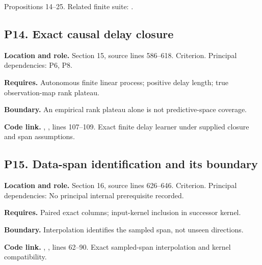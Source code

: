\documentclass[11pt,oneside,openany]{book}
\numberwithin{equation}{section}
\begin{document}
Propositions 14--25. Related finite suite:
.

\par\noindent\begin{minipage}{\textwidth}
\subsection{P14. Exact causal delay
closure}\label{LSMRegister:p14.-exact-causal-delay-closure}

\textbf{Location and role.} Section 15, source lines 586--618.
Criterion. Principal dependencies: P6, P8.

\textbf{Requires.} Autonomous finite linear process; positive delay
length; true observation-map rank plateau.

\textbf{Boundary.} An empirical rank plateau alone is not
predictive-space coverage.

\textbf{Code link.} ,
, lines 107--109. Exact finite delay learner under
supplied closure and span assumptions.
\end{minipage}\par\medskip

\par\noindent\begin{minipage}{\textwidth}
\subsection{P15. Data-span identification and its
boundary}\label{LSMRegister:p15.-data-span-identification-and-its-boundary}

\textbf{Location and role.} Section 16, source lines 626--646.
Criterion. Principal dependencies: No principal internal prerequisite
recorded.

\textbf{Requires.} Paired exact columns; input-kernel inclusion in
successor kernel.

\textbf{Boundary.} Interpolation identifies the sampled span, not unseen
directions.

\textbf{Code link.} ,
, lines 62--90. Exact sampled-span
interpolation and kernel compatibility.
\end{minipage}\par\medskip
\end{document}
